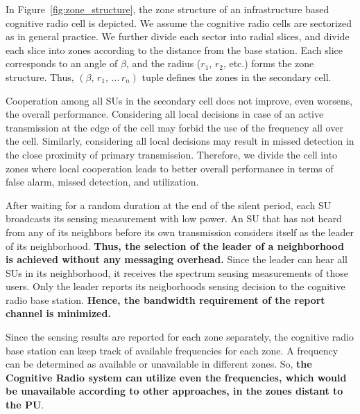 \documentclass[conference,compsoc]{IEEEtran}
\newcommand{\CR}{cognitive radio }
\begin{document}
In Figure~\ref{fig:zone_structure}, the zone structure of an infrastructure based \CR cell is depicted. We assume the \CR cells are sectorized as in general practice. We further divide each sector into radial slices, and divide each slice into zones according to the distance from the base station. Each slice corresponds to an angle of $\beta$, and the radius ($r_1$, $r_2$, etc.) forms the zone structure. Thus, $(\beta, \, r_1, \, ... \, r_n)$ tuple defines the zones in the secondary cell.

Cooperation among all SUs in the secondary cell does not improve, even worsens, the overall performance. Considering all local decisions in case of an active transmission at the edge of the cell may forbid the use of the frequency all over the cell. Similarly, considering all local decisions may result in missed detection in the close proximity of primary transmission. Therefore, we divide the cell into zones where local cooperation leads to better overall performance in terms of false alarm, missed detection, and utilization.

After waiting for a random duration at the end of the silent period, each SU broadcasts its sensing measurement with low power. An SU that has not heard from any of its neighbors before its own transmission considers itself as the leader of its neighborhood. \textbf{Thus, the selection of the leader of a neighborhood is achieved without any messaging overhead.} Since the leader can hear all SUs in its neighborhood, it receives the spectrum sensing measurements of those users. Only the leader reports its neigborhoods sensing decision to the \CR base station. \textbf{Hence, the bandwidth requirement of the report channel is minimized.}

Since the sensing results are reported for each zone separately, the \CR base station can keep track of available frequencies for each zone. A frequency can be determined as available or unavailable in different zones. So, \textbf{the Cognitive Radio system can utilize even the frequencies, which would be unavailable according to other approaches, in the zones distant to the PU}.
\end{document}
